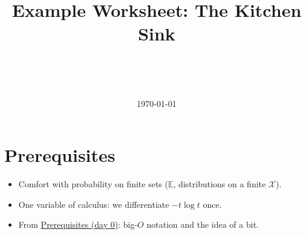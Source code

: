 \documentclass[11pt]{article}
\title{Example Worksheet: The Kitchen Sink}
\author{\authorname{Jane Doe}\\ \affiliation{Example University}
  \and \authorname{John Roe}\\ \affiliation{Example Institute}}
\date{\today}
\newcommand{\E}{\mathbb{E}}
\begin{document}
\maketitle

\tableofcontents



\section{Prerequisites}
\label{sec:prereqs}

\begin{itemize}
  \item Comfort with probability on finite sets ($\E$, distributions on a
        finite $\mathcal{X}$).
  \item One variable of calculus: we differentiate $-t \log t$ once.
  \item From \href{/foundations/prerequisites}{Prerequisites (day 0)}: big-$O$
        notation and the idea of a bit.
\end{itemize}
\end{document}
